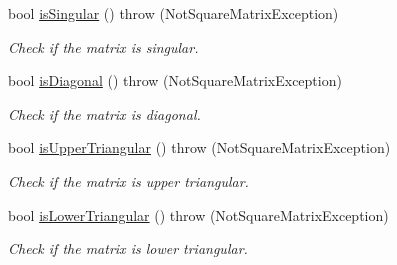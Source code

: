\begin{CompactItemize}
$$bool \hyperlink{classgrassmann_1_1Matrix_02841902fbf25602ef2a49ada709e993}{isSingular} ()  throw (NotSquareMatrixException)
\begin{CompactList}\small\item\em Check if the matrix is singular. \item\end{CompactList}\item 
bool \hyperlink{classgrassmann_1_1Matrix_0ec5a24568e808ce4fc48514842e7633}{isDiagonal} ()  throw (NotSquareMatrixException)
\begin{CompactList}\small\item\em Check if the matrix is diagonal. \item\end{CompactList}\item 
bool \hyperlink{classgrassmann_1_1Matrix_9e2ca56c045111a88dd23583c4d03f8e}{isUpperTriangular} ()  throw (NotSquareMatrixException)
\begin{CompactList}\small\item\em Check if the matrix is upper triangular. \item\end{CompactList}\item 
bool \hyperlink{classgrassmann_1_1Matrix_dda0c95c0df60ee264883c22da6d8b76}{isLowerTriangular} ()  throw (NotSquareMatrixException)
\begin{CompactList}\small\item\em Check if the matrix is lower triangular. \item\end{CompactList}\end{CompactItemize}
